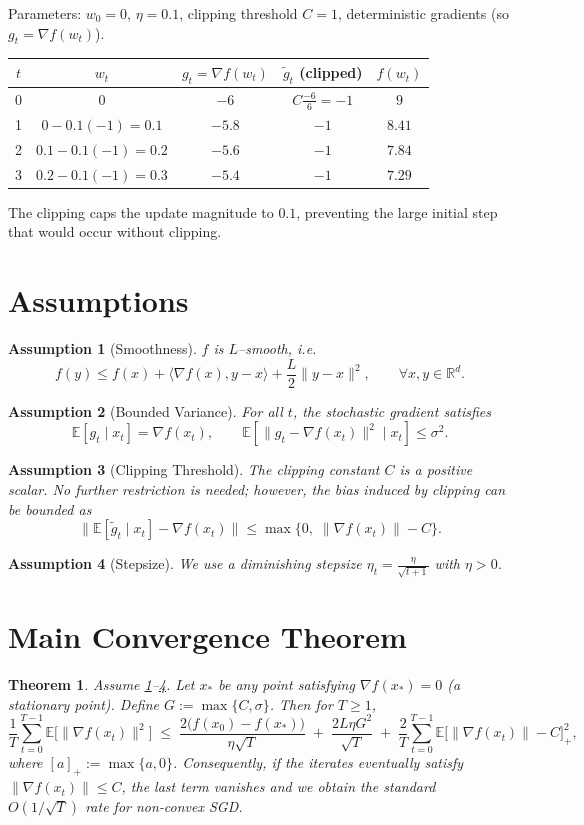 \documentclass{article}
\newtheorem{theorem}{Theorem}
\newtheorem{assumption}{Assumption}
\newcommand{\EE}{\mathbb{E}}
\newcommand{\norm}[1]{\left\|#1\right\|}
\begin{document}
Parameters: $w_0=0$, $\eta=0.1$, clipping threshold $C=1$,
deterministic gradients (so $g_t=\nabla f(w_t)$).

\begin{center}
\begin{tabular}{c|c|c|c|c}
$t$ & $w_t$ & $g_t=\nabla f(w_t)$ & $\tilde g_t$ (clipped) & $f(w_t)$\\ \hline
0 & $0$   & $-6$   & $C\frac{-6}{6}=-1$ & $9$\\
1 & $0-0.1(-1)=0.1$ & $-5.8$ & $-1$ & $8.41$\\
2 & $0.1-0.1(-1)=0.2$ & $-5.6$ & $-1$ & $7.84$\\
3 & $0.2-0.1(-1)=0.3$ & $-5.4$ & $-1$ & $7.29$
\end{tabular}
\end{center}
The clipping caps the update magnitude to $0.1$, preventing the large initial step that would occur without clipping.

\newpage
\section*{Assumptions}
\begin{assumption}[Smoothness]\label{ass:smooth}
$f$ is $L$–smooth, i.e.
\[
f(y)\le f(x)+\langle\nabla f(x),y-x\rangle+\frac{L}{2}\|y-x\|^2,
\qquad\forall x,y\in\mathbb R^d .
\]
\end{assumption}
\begin{assumption}[Bounded Variance]\label{ass:var}
For all $t$, the stochastic gradient satisfies
\[
\EE[g_t\mid x_t]=\nabla f(x_t),\qquad 
\EE\!\left[\|g_t-\nabla f(x_t)\|^2\mid x_t\right]\le\sigma^2 .
\]
\end{assumption}
\begin{assumption}[Clipping Threshold]\label{ass:clip}
The clipping constant $C$ is a positive scalar. No further restriction is needed; however,
the bias induced by clipping can be bounded as
\[
\big\|\EE[\tilde g_t\mid x_t]-\nabla f(x_t)\big\|
   \le \max\{0,\;\norm{\nabla f(x_t)}-C\}.
\tag{3}
\]
\end{assumption}
\begin{assumption}[Stepsize]\label{ass:stepsize}
We use a diminishing stepsize $\eta_t=\frac{\eta}{\sqrt{t+1}}$ with $\eta>0$.
\end{assumption}

\section*{Main Convergence Theorem}
\begin{theorem}\label{thm:main}
Assume \ref{ass:smooth}--\ref{ass:stepsize}. Let $x_*$ be any point satisfying 
$\nabla f(x_*)=0$ (a stationary point). Define $G:=\max\{C,\sigma\}$.
Then for $T\ge1$,
\[
\frac{1}{T}\sum_{t=0}^{T-1}
   \EE\!\big[\|\nabla f(x_t)\|^2\big]
   \;\le\;
   \frac{2\big(f(x_0)-f(x_*)\big)}{\eta\sqrt{T}}
   \;+\;
   \frac{2L\eta G^2}{\sqrt{T}}
   \;+\;
   \frac{2}{T}\sum_{t=0}^{T-1}\EE\!\big[\|\nabla f(x_t)\|-C\big]_+^{2},
\tag{4}
\]
where $[a]_+:=\max\{a,0\}$. Consequently, if the iterates eventually satisfy $\|\nabla f(x_t)\|\le C$, the last term vanishes and we obtain the standard $O(1/\sqrt{T})$ rate for non‑convex SGD.
\end{theorem}
\end{document}
